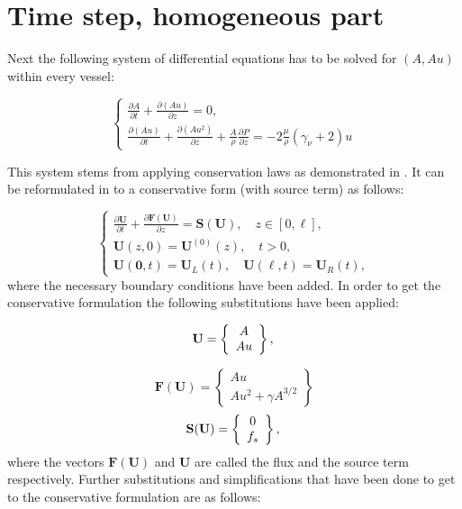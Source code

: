 \documentclass[a4paper, oneside]{discothesis}
\begin{document}
\section{Time step, homogeneous part}
Next the following system of differential equations has to be solved for $(A,Au)$ within every vessel:

\begin{equation}
	\left\{\begin{array}{l}\frac{\partial A}{\partial t} + \frac{\partial(Au)}{\partial z} = 0,\\
	\frac{\partial (Au)}{\partial t} + \frac{\partial (Au^2)}{\partial z} + \frac{A}{\rho} \frac{\partial P}{\partial z} = -2 \frac{\mu}{\rho}(\gamma_\nu + 2)u \end{array} \right.
\end{equation}

This system stems from applying conservation laws as demonstrated in \cite{book}.
It can be reformulated in to a conservative form (with source term) as follows:

\begin{equation}
	\left\{\begin{array}{l}
			\frac{\partial \mathbf{U}}{\partial t}+\frac{\partial \mathbf{F}(\mathbf{U})}{\partial z}=\mathbf{S}(\mathbf{U}), \quad z \in[0, \ell], \\
			\mathbf{U}(z, 0)=\mathbf{U}^{(0)}(z), \quad t>0, \\
			\mathbf{U}(\mathbf{0}, t)=\mathbf{U}_L(t), \quad \mathbf{U}(\ell, t)=\mathbf{U}_R(t),
	\end{array}\right.
\end{equation}
where the necessary boundary conditions have been added.
In order to get the conservative formulation the following substitutions have been applied:

\begin{equation}
	\mathbf{U}=\left\{\begin{array}{c}
			A \\
			A u
	\end{array}\right\}, \\
\end{equation}

\begin{equation}
	\mathbf{F}(\mathbf{U})=\left\{\begin{array}{c}
			A u \\
			A u^2+\gamma A^{3 / 2}
	\end{array}\right\}
\end{equation}
\begin{equation}
	\mathbf{S}(\mathbf{U})=\left\{\begin{array}{c}
			0 \\

			f_s
	\end{array}\right\}, \\
\end{equation}
where the vectors $\mathbf{F}(\mathbf{U})$ and $\mathbf{U}$ are called the flux and the source term respectively.
Further substitutions and simplifications that have been done to get to the conservative formulation are as follows:
\end{document}
